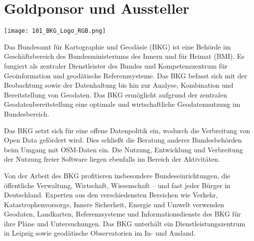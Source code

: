 \section*{Goldponsor und Aussteller}

\centerline{\texttt{[image: 101\_BKG\_Logo\_RGB.png]}}
\small
Das Bundesamt für Kartographie und Geodäsie (BKG) ist eine Behörde im Geschäftsbereich des Bundesministeriums des Innern und für Heimat (BMI). Es fungiert als zentraler Dienstleister des Bundes und Kompetenzzentrum für Geoinformation und geodätische Referenzsysteme. Das BKG befasst sich mit der Beobachtung sowie der Datenhaltung bis hin zur Analyse, Kombination und Bereitstellung von Geodaten. Das BKG ermöglicht aufgrund der zentralen Geodatenbereitstellung eine optimale und wirtschaftliche Geodatennutzung im Bundesbereich.

Das BKG setzt sich für eine offene Datenpolitik ein, wodurch die Verbreitung von Open Data gefördert wird. Dies schließt die Beratung anderer Bundesbehörden beim Umgang mit OSM-Daten ein. Die Nutzung, Entwicklung und Verbreitung der Nutzung freier Software liegen ebenfalls im Bereich der Aktivitäten.

Von der Arbeit des BKG profitieren insbesondere Bundeseinrichtungen, die öffentliche Verwaltung, Wirtschaft, Wissenschaft – und fast jeder Bürger in Deutschland. Experten aus den verschiedensten Bereichen wie Verkehr, Katastrophenvorsorge, Innere Sicherheit, Energie und Umwelt verwenden Geodaten, Landkarten, Referenzsysteme und Informationsdienste des BKG für ihre Pläne und Untersuchungen. Das BKG unterhält ein Dienstleistungszentrum in Leipzig sowie geodätische Observatorien im In- und Ausland.
